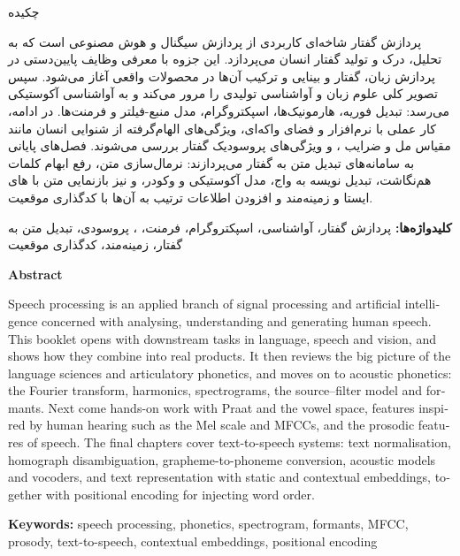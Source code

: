 \begingroup
\thispagestyle{empty}
{\titlefont\LARGE چکیده\par}
\vspace{1.5em}
پردازش گفتار شاخه‌ای کاربردی از پردازش سیگنال و هوش مصنوعی است که به تحلیل، درک و تولید گفتار انسان می‌پردازد. این جزوه با معرفی وظایف پایین‌دستی در پردازش زبان، گفتار و بینایی و ترکیب آن‌ها در محصولات واقعی آغاز می‌شود. سپس تصویر کلی علوم زبان و آواشناسی تولیدی را مرور می‌کند و به آواشناسی آکوستیکی می‌رسد: تبدیل فوریه، هارمونیک‌ها، اسپکتروگرام، مدل منبع-فیلتر و فرمنت‌ها. در ادامه، کار عملی با نرم‌افزار  و فضای واکه‌ای، ویژگی‌های الهام‌گرفته از شنوایی انسان مانند مقیاس مل و ضرایب ، و ویژگی‌های پروسودیک گفتار بررسی می‌شوند. فصل‌های پایانی به سامانه‌های تبدیل متن به گفتار می‌پردازند: نرمال‌سازی متن، رفع ابهام کلمات هم‌نگاشت، تبدیل نویسه به واج، مدل آکوستیکی و وکودر، و نیز بازنمایی متن با های ایستا و زمینه‌مند و افزودن اطلاعات ترتیب به آن‌ها با کدگذاری موقعیت.

\vfill
\textbf{کلیدواژه‌ها:} پردازش گفتار، آواشناسی، اسپکتروگرام، فرمنت، ، پروسودی، تبدیل متن به گفتار،  زمینه‌مند، کدگذاری موقعیت
\clearpage
\endgroup

\begingroup
\thispagestyle{empty}
\begin{latin}
{\LARGE\bfseries Abstract\par}
\vspace{1.5em}
Speech processing is an applied branch of signal processing and artificial intelligence concerned with analysing, understanding and generating human speech. This booklet opens with downstream tasks in language, speech and vision, and shows how they combine into real products. It then reviews the big picture of the language sciences and articulatory phonetics, and moves on to acoustic phonetics: the Fourier transform, harmonics, spectrograms, the source--filter model and formants. Next come hands-on work with Praat and the vowel space, features inspired by human hearing such as the Mel scale and MFCCs, and the prosodic features of speech. The final chapters cover text-to-speech systems: text normalisation, homograph disambiguation, grapheme-to-phoneme conversion, acoustic models and vocoders, and text representation with static and contextual embeddings, together with positional encoding for injecting word order.

\vfill
\textbf{Keywords:} speech processing, phonetics, spectrogram, formants, MFCC, prosody, text-to-speech, contextual embeddings, positional encoding
\end{latin}
\clearpage
\endgroup


